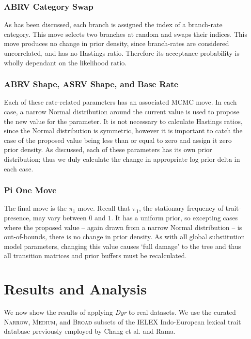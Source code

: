 \documentclass[10pt,journal,compsoc]{IEEEtran}
\begin{document}
\subsubsection{ABRV Category Swap}

As has been discussed, each branch is assigned the index of a branch-rate category. This move selects two branches at random and swaps their indices. This move produces no change in prior density, since branch-rates are considered uncorrelated, and has no Hastings ratio. Therefore its acceptance probability is wholly dependant on the likelihood ratio.

\subsubsection{ABRV Shape, ASRV Shape, and Base Rate}

Each of these rate-related parameters has an associated MCMC move. In each case, a narrow Normal distribution around the current value is used to propose the new value for the parameter. It is not necessary to calculate Hastings ratios, since the Normal distribution is symmetric, however it is important to catch the case of the proposed value being less than or equal to zero and assign it zero prior density. As discussed, each of these parameters has its own prior distribution; thus we duly calculate the change in appropriate log prior delta in each case.

\subsubsection{Pi One Move}

The final move is the $\pi_1$ move. Recall that $\pi_1$, the stationary frequency of trait-presence, may vary between $0$ and $1$. It has a uniform prior, so excepting cases where the proposed value -- again drawn from a narrow Normal distribution -- is out-of-bounds, there is no change in prior density. As with all global substitution model parameters, changing this value causes `full damage' to the tree and thus all transition matrices and prior buffers must be recalculated.

\section{Results and Analysis}\label{sec:results}

We now show the results of applying \textit{Dyr} to real datasets. We use the curated \textsc{Narrow}, \textsc{Medium}, and \textsc{Broad} subsets of the IELEX Indo-European lexical trait database previously employed by Chang et al. and Rama.
\end{document}
